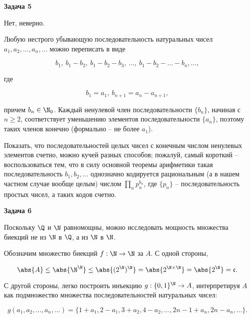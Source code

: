 	\begin{center}
    \textbf{Задача 5}
\end{center}
		Нет, неверно.

		Любую нестрого убывающую последовательность натуральных чисел $a_1, a_2, \dots, a_n, \dots$ можно переписать в виде

		\begin{equation*}
			b_1, \ b_1 - b_2, \ b_1 - b_2 - b_3, \ \dots, \ b_1 - b_2 - \dots - b_n, \dots,
		\end{equation*}

		где

		\begin{equation*}
			b_1 = a_1, \ b_{n+1} = a_n - a_{n+1},
		\end{equation*}

		причем $b_n \in \N_0$. Каждый ненулевой член последовательности $\{b_n\}$, начиная с $n \ge 2$, соответствует уменьшению элементов последовательности $\{a_n\}$, поэтому таких членов конечно (формально -- не более $a_1$).

		Показать, что последовательностей целых чисел с конечным числом ненулевых элементов счетно, можно кучей разных способов; пожалуй, самый короткий -- воспользоваться тем, что в силу основной теоремы арифметики такая последовательность $b_1, b_2, \dots$ однозначно кодируется рациональным (а в нашем частном случае вообще целым) числом $\prod_n p_n^{b_n}$, где $\{p_n\}$ -- последовательность простых чисел, а таких кодов счетно.


	\begin{center}
    \textbf{Задача 6}
\end{center}
		Поскольку $\Q$ и $\N$ равномощны, можно исследовать мощность множества биекций не из $\N$ в $\Q$, а из $\N$ в $\N$.

		Обозначим множество биекций $f: \N \to \N$ за $A$. С одной стороны,

		\begin{equation*}
			\abs{A} \le \abs{\N^{\N}} \le \abs{(2^{\N})^{\N}} = \abs{2^{\N \times \N}} = \abs{2^{\N}} = \mathfrak{c}.
		\end{equation*}

		С другой стороны, легко построить инъекцию $g: \{0, 1\}^{\N} \to A$, интерпретируя $A$ как подмножество множества последовательностей натуральных чисел:

		\begin{equation*}
			g(a_1, a_2, \dots, a_n, \dots) = \{1 + a_1, 2 - a_1, 3 + a_2, 4 - a_2, \dots, 2n - 1 + a_n, 2n - a_n, \dots\}.
		\end{equation*}

